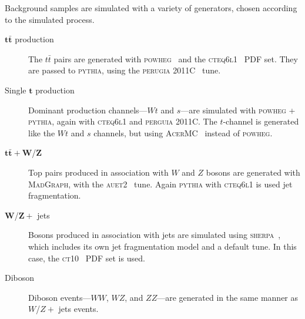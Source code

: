 Background samples are simulated with a variety of generators, chosen according to the simulated process.
\begin{description}
\item[$\bm{t \bar{t}}$ production] The $t\bar{t}$ pairs are generated with \textsc{powheg}~\cite{powheg} and the \textsc{cteq6l1}~\cite{cteq} PDF set. They are passed to \textsc{pythia}, using the \textsc{perugia 2011C}~\cite{perugia} tune.
\item[Single $\bm{t}$ production] Dominant production channels---$Wt$ and $s$---are simulated with \textsc{powheg + pythia}, again with \textsc{cteq6l1} and \textsc{perguia 2011C}.
The $t$-channel is generated like the $Wt$ and $s$ channels, but using \textsc{AcerMC}~\cite{acermc} instead of \textsc{powheg}.
\item[$\bm{t \bar{t}} + \bm{W}$/$\bm{Z}$] Top pairs produced in association with $W$ and $Z$ bosons are generated with \textsc{MadGraph}, with the \textsc{auet2}~\cite{auet2} tune. Again \textsc{pythia} with \textsc{cteq6l1} is used jet fragmentation.
\item[$\bm{W}$/$\bm{Z} + $ jets] Bosons produced in association with jets are simulated using \textsc{sherpa}~\cite{sherpa}, which includes its own jet fragmentation model and a default tune. In this case, the \textsc{ct10}~\cite{CT10} PDF set is used.
\item[Diboson] Diboson events---$WW$, $WZ$, and $ZZ$---are generated in the same manner as $W$/$Z + $ jets events.
\end{description}

